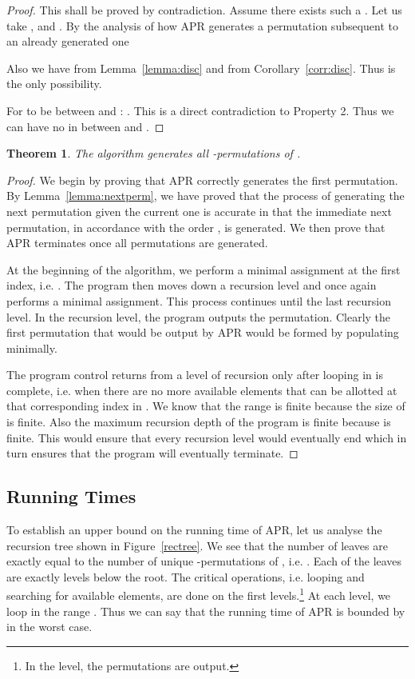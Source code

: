 \documentclass{article}
\newtheorem{theorem}[defn]{Theorem}
\begin{document}
\begin{proof}
This shall be proved by contradiction. Assume there exists such a . Let us take ,  and . By the analysis of how APR generates a permutation subsequent to an already generated one

 Also we have  from Lemma~\ref{lemma:disc} and  from Corollary~\ref{corr:disc}. Thus  is the only possibility.

For  to be between  and : . This is a direct contradiction to Property 2. Thus we can have no  in between  and . \end{proof}

\begin{theorem}
 The algorithm generates all -permutations of .
\end{theorem}

\begin{proof}
 We begin by proving that APR correctly generates the first permutation. By Lemma~\ref{lemma:nextperm}, we have proved that the process of generating the next permutation given the current one is accurate in that the immediate next permutation, in accordance with the order , is generated. We then prove that APR terminates once all permutations are generated.

At the beginning of the algorithm, we perform a minimal assignment at the first index, i.e. . The program then moves down a recursion level and once again performs a minimal assignment. This process continues until the last recursion level. In the  recursion level, the program outputs the permutation. Clearly the first permutation that would be output by APR would be formed by populating  minimally.

The program control returns from a level of recursion only after looping in  is complete, i.e. when there are no more available elements that can be allotted at that corresponding index in . We know that the range  is finite because the size of  is finite. Also the maximum recursion depth of the program is finite because  is finite. This would ensure that every recursion level would eventually end which in turn ensures that the program will eventually terminate. \end{proof}

\subsection{Running Times}
\label{sec:anal:subsec:runtime}

To establish an upper bound on the running time of APR, let us analyse the recursion tree shown in Figure~\ref{rectree}. We see that the number of leaves are exactly equal to the number of unique -permutations of , i.e. . Each of the leaves are exactly  levels below the root. The critical operations, i.e. looping and searching for available elements, are done on the first  levels.\footnote{In the  level, the permutations are output.} At each level, we loop in the range . Thus we can say that the running time of APR is bounded by  in the worst case.
\end{document}
